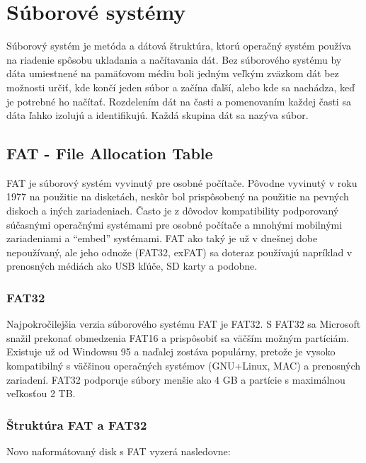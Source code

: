 \documentclass[12pt,oneside,slovak,a4paper]{article}
\begin{document}

\section{Súborové systémy}
Súborový systém je metóda a dátová štruktúra, ktorú operačný systém používa na riadenie spôsobu ukladania a načítavania dát. Bez súborového systému by dáta umiestnené na pamäťovom médiu boli jedným veľkým zväzkom dát bez možnosti určiť, kde končí jeden súbor a začína ďalší, alebo kde sa nachádza, keď je potrebné ho načítať. Rozdelením dát na časti a pomenovaním každej časti sa dáta ľahko izolujú a identifikujú. Každá skupina dát sa nazýva súbor.

\subsection{FAT - File Allocation Table}
FAT je súborový systém vyvinutý pre osobné počítače. Pôvodne vyvinutý v roku 1977 na použitie na disketách, neskôr bol prispôsobený na použitie na pevných diskoch a iných zariadeniach. Často je z dôvodov kompatibility podporovaný súčasnými operačnými systémami pre osobné počítače a mnohými mobilnými zariadeniami a ``embed'' systémami. FAT ako taký je už v dnešnej dobe nepoužívaný, ale jeho odnože (FAT32, exFAT) sa doteraz používajú napríklad v prenosných médiách ako USB kľúče, SD karty a podobne.

\subsubsection{FAT32}
Najpokročilejšia verzia súborového systému FAT je FAT32. S FAT32 sa Microsoft snažil prekonať obmedzenia FAT16 a prispôsobiť sa väčším možným partíciám. Existuje už od Windowsu 95 a naďalej zostáva populárny, pretože je vysoko kompatibilný s väčšinou operačných systémov (GNU+Linux, MAC) a prenosných zariadení. FAT32 podporuje súbory menšie ako 4 GB a partície s maximálnou veľkosťou 2 TB.

\subsubsection{Štruktúra FAT a FAT32}
Novo naformátovaný disk s FAT vyzerá nasledovne:
\end{document}
